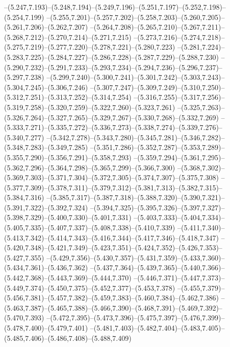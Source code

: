   --(5.247,7.193)--(5.248,7.194)--(5.249,7.196)--(5.251,7.197)--(5.252,7.198)--(5.254,7.199)%
  --(5.255,7.201)--(5.257,7.202)--(5.258,7.203)--(5.260,7.205)--(5.261,7.206)--(5.262,7.207)%
  --(5.264,7.208)--(5.265,7.210)--(5.267,7.211)--(5.268,7.212)--(5.270,7.214)--(5.271,7.215)%
  --(5.273,7.216)--(5.274,7.218)--(5.275,7.219)--(5.277,7.220)--(5.278,7.221)--(5.280,7.223)%
  --(5.281,7.224)--(5.283,7.225)--(5.284,7.227)--(5.286,7.228)--(5.287,7.229)--(5.288,7.230)%
  --(5.290,7.232)--(5.291,7.233)--(5.293,7.234)--(5.294,7.236)--(5.296,7.237)--(5.297,7.238)%
  --(5.299,7.240)--(5.300,7.241)--(5.301,7.242)--(5.303,7.243)--(5.304,7.245)--(5.306,7.246)%
  --(5.307,7.247)--(5.309,7.249)--(5.310,7.250)--(5.312,7.251)--(5.313,7.252)--(5.314,7.254)%
  --(5.316,7.255)--(5.317,7.256)--(5.319,7.258)--(5.320,7.259)--(5.322,7.260)--(5.323,7.261)%
  --(5.325,7.263)--(5.326,7.264)--(5.327,7.265)--(5.329,7.267)--(5.330,7.268)--(5.332,7.269)%
  --(5.333,7.271)--(5.335,7.272)--(5.336,7.273)--(5.338,7.274)--(5.339,7.276)--(5.340,7.277)%
  --(5.342,7.278)--(5.343,7.280)--(5.345,7.281)--(5.346,7.282)--(5.348,7.283)--(5.349,7.285)%
  --(5.351,7.286)--(5.352,7.287)--(5.353,7.289)--(5.355,7.290)--(5.356,7.291)--(5.358,7.293)%
  --(5.359,7.294)--(5.361,7.295)--(5.362,7.296)--(5.364,7.298)--(5.365,7.299)--(5.366,7.300)%
  --(5.368,7.302)--(5.369,7.303)--(5.371,7.304)--(5.372,7.305)--(5.374,7.307)--(5.375,7.308)%
  --(5.377,7.309)--(5.378,7.311)--(5.379,7.312)--(5.381,7.313)--(5.382,7.315)--(5.384,7.316)%
  --(5.385,7.317)--(5.387,7.318)--(5.388,7.320)--(5.390,7.321)--(5.391,7.322)--(5.392,7.324)%
  --(5.394,7.325)--(5.395,7.326)--(5.397,7.327)--(5.398,7.329)--(5.400,7.330)--(5.401,7.331)%
  --(5.403,7.333)--(5.404,7.334)--(5.405,7.335)--(5.407,7.337)--(5.408,7.338)--(5.410,7.339)%
  --(5.411,7.340)--(5.413,7.342)--(5.414,7.343)--(5.416,7.344)--(5.417,7.346)--(5.418,7.347)%
  --(5.420,7.348)--(5.421,7.349)--(5.423,7.351)--(5.424,7.352)--(5.426,7.353)--(5.427,7.355)%
  --(5.429,7.356)--(5.430,7.357)--(5.431,7.359)--(5.433,7.360)--(5.434,7.361)--(5.436,7.362)%
  --(5.437,7.364)--(5.439,7.365)--(5.440,7.366)--(5.442,7.368)--(5.443,7.369)--(5.444,7.370)%
  --(5.446,7.371)--(5.447,7.373)--(5.449,7.374)--(5.450,7.375)--(5.452,7.377)--(5.453,7.378)%
  --(5.455,7.379)--(5.456,7.381)--(5.457,7.382)--(5.459,7.383)--(5.460,7.384)--(5.462,7.386)%
  --(5.463,7.387)--(5.465,7.388)--(5.466,7.390)--(5.468,7.391)--(5.469,7.392)--(5.470,7.393)%
  --(5.472,7.395)--(5.473,7.396)--(5.475,7.397)--(5.476,7.399)--(5.478,7.400)--(5.479,7.401)%
  --(5.481,7.403)--(5.482,7.404)--(5.483,7.405)--(5.485,7.406)--(5.486,7.408)--(5.488,7.409)%
